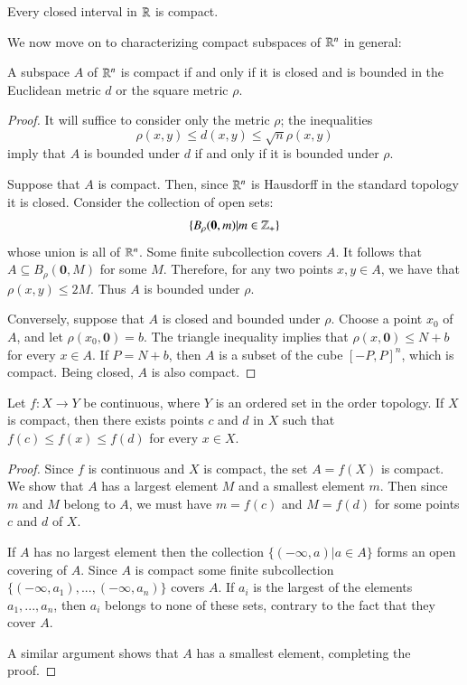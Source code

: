 \documentclass[12pt, a4paper, oneside, openright, titlepage]{book}
\begin{document}
\begin{corollary}
    Every closed interval in $\mathbb R$ is compact.
\end{corollary}

We now move on to characterizing compact subspaces of $\mathbb R^n$ in general:

\begin{theorem}
    A subspace $A$ of $\mathbb R^n$ is compact if and only if it is closed and is bounded in the Euclidean metric $d$ or the square metric $\rho$.
\end{theorem}
\begin{proof}
    It will suffice to consider only the metric $\rho$; the inequalities \begin{equation*}
        \rho(x,y) \leq d(x,y) \leq \sqrt{n}\rho(x,y)
    \end{equation*}
    imply that $A$ is bounded under $d$ if and only if it is bounded under $\rho$.

    Suppose that $A$ is compact. Then, since $\mathbb R^n$ is Hausdorff in the standard topology it is closed. Consider the collection of open sets: 
    \begin{equation*}
        \{B_{\rho}(\mathbf{0},m)\vert m \in \mathbb Z_+\}
    \end{equation*}
    whose union is all of $\mathbb R^n$. Some finite subcollection covers $A$. It follows that $A \subseteq B_{\rho}(\mathbf{0},M)$ for some $M$. Therefore, for any two points $x,y \in A$, we have that $\rho(x,y) \leq 2M$. Thus $A$ is bounded under $\rho$.

    Conversely, suppose that $A$ is closed and bounded under $\rho$. Choose a point $x_0$ of $A$, and let $\rho(x_0,\mathbf{0}) = b$. The triangle inequality implies that $\rho(x,\mathbf{0})\leq N + b$ for every $x \in A$. If $P = N + b$, then $A$ is a subset of the cube $[-P,P]^n$, which is compact. Being closed, $A$ is also compact.
\end{proof}

\begin{theorem}
     Let $f:X\rightarrow Y$ be continuous, where $Y$ is an ordered set in the order topology. If $X$ is compact, then there exists points $c$ and $d$ in $X$ such that $f(c) \leq f(x) \leq f(d)$ for every $x \in X$.
\end{theorem}
\begin{proof}
    Since $f$ is continuous and $X$ is compact, the set $A = f(X)$ is compact. We show that $A$ has a largest element $M$ and a smallest element $m$. Then since $m$ and $M$ belong to $A$, we must have $m = f(c)$ and $M = f(d)$ for some points $c$ and $d$ of $X$.

    If $A$ has no largest element then the collection $\{(-\infty,a)\vert a \in A\}$ forms an open covering of $A$. Since $A$ is compact some finite subcollection $\{(-\infty,a_1),...,(-\infty,a_n)\}$ covers $A$. If $a_i$ is the largest of the elements $a_1,...,a_n$, then $a_i$ belongs to none of these sets, contrary to the fact that they cover $A$.
    
    A similar argument shows that $A$ has a smallest element, completing the proof.
\end{proof}
\end{document}
